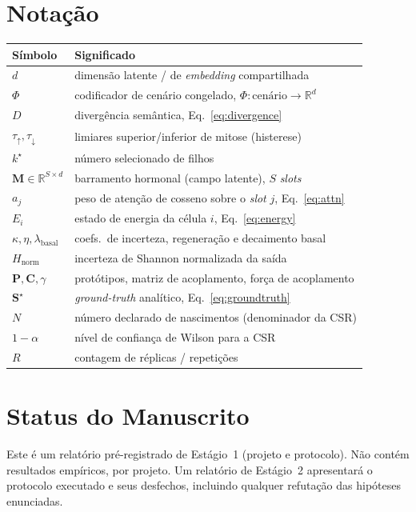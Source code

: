 \documentclass[11pt]{article}
\newcommand{\R}{\mathbb{R}}
\begin{document}
\appendix
\section{Notação}
\begin{table}[h]
\centering
\small
\begin{tabular}{@{}ll@{}}
\toprule
\textbf{Símbolo} & \textbf{Significado}\\
\midrule
$d$ & dimensão latente / de \emph{embedding} compartilhada\\
$\Phi$ & codificador de cenário congelado, $\Phi:\text{cenário}\to\R^d$\\
$D$ & divergência semântica, Eq.~\eqref{eq:divergence}\\
$\tau_{\uparrow},\tau_{\downarrow}$ & limiares superior/inferior de mitose (histerese)\\
$k^\star$ & número selecionado de filhos\\
$\mathbf{M}\in\R^{S\times d}$ & barramento hormonal (campo latente), $S$ \emph{slots}\\
$a_j$ & peso de atenção de cosseno sobre o \emph{slot} $j$, Eq.~\eqref{eq:attn}\\
$E_i$ & estado de energia da célula $i$, Eq.~\eqref{eq:energy}\\
$\kappa,\eta,\lambda_{\text{basal}}$ & coefs.\ de incerteza, regeneração e decaimento basal\\
$H_{\text{norm}}$ & incerteza de Shannon normalizada da saída\\
$\mathbf{P},\mathbf{C},\gamma$ & protótipos, matriz de acoplamento, força de acoplamento\\
$\mathbf{S}^\star$ & \emph{ground-truth} analítico, Eq.~\eqref{eq:groundtruth}\\
$N$ & número declarado de nascimentos (denominador da CSR)\\
$1-\alpha$ & nível de confiança de Wilson para a CSR\\
$R$ & contagem de réplicas / repetições\\
\bottomrule
\end{tabular}
\end{table}

\section*{Status do Manuscrito}
\noindent Este é um relatório pré-registrado de Estágio~1 (projeto e protocolo).
Não contém resultados empíricos, por projeto. Um relatório de Estágio~2
apresentará o protocolo executado e seus desfechos, incluindo qualquer refutação
das hipóteses enunciadas.
\end{document}
